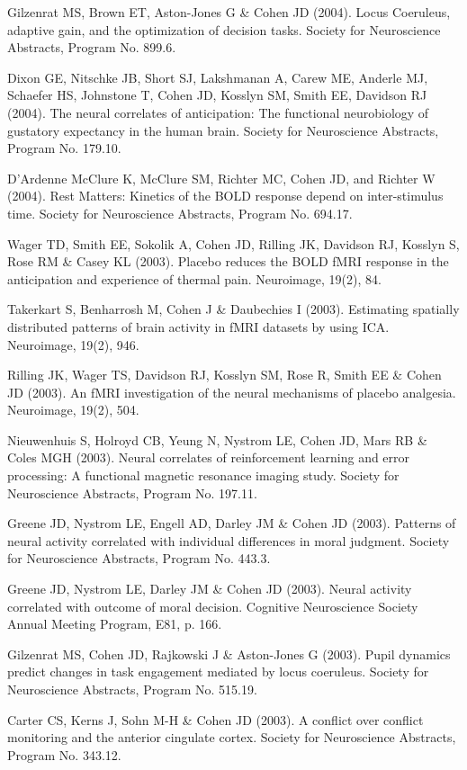 \documentclass[10 pt]{article}
\begin{document}
Gilzenrat MS, Brown ET, Aston-Jones G \& Cohen JD (2004). Locus Coeruleus, adaptive gain, and the optimization of decision tasks. Society for Neuroscience Abstracts, Program No. 899.6.

Dixon GE, Nitschke JB, Short SJ, Lakshmanan A, Carew ME, Anderle MJ, Schaefer HS, Johnstone T, Cohen JD, Kosslyn SM, Smith EE, Davidson RJ (2004). The neural correlates of anticipation: The functional neurobiology of gustatory expectancy in the human brain. Society for Neuroscience Abstracts, Program No. 179.10.

D’Ardenne McClure K, McClure SM, Richter MC, Cohen JD, and Richter W (2004). Rest Matters: Kinetics of the BOLD response depend on inter-stimulus time. Society for Neuroscience Abstracts, Program No. 694.17.

Wager TD, Smith EE, Sokolik A, Cohen JD, Rilling JK, Davidson RJ, Kosslyn S, Rose RM \& Casey KL (2003). Placebo reduces the BOLD fMRI response in the anticipation and experience of thermal pain. Neuroimage, 19(2), 84.

Takerkart S, Benharrosh M, Cohen J \& Daubechies I (2003). Estimating spatially distributed patterns of brain activity in fMRI datasets by using ICA. Neuroimage, 19(2), 946.

Rilling JK, Wager TS, Davidson RJ, Kosslyn SM, Rose R, Smith EE \& Cohen JD (2003). An fMRI investigation of the neural mechanisms of placebo analgesia. Neuroimage, 19(2), 504.

Nieuwenhuis S, Holroyd CB, Yeung N, Nystrom LE, Cohen JD, Mars RB \& Coles MGH (2003). Neural correlates of reinforcement learning and error processing: A functional magnetic resonance imaging study. Society for Neuroscience Abstracts, Program No. 197.11.

Greene JD, Nystrom LE, Engell AD, Darley JM \& Cohen JD (2003). Patterns of neural activity correlated with individual differences in moral judgment. Society for Neuroscience Abstracts, Program No. 443.3.

Greene JD, Nystrom LE, Darley JM \& Cohen JD (2003). Neural activity correlated with outcome of moral decision. Cognitive Neuroscience Society  Annual Meeting Program, E81, p. 166.

Gilzenrat MS, Cohen JD, Rajkowski J \& Aston-Jones G (2003). Pupil dynamics predict changes in task engagement mediated by locus coeruleus. Society for Neuroscience Abstracts, Program No. 515.19.

Carter CS, Kerns J, Sohn M-H \& Cohen JD (2003). A conflict over conflict monitoring and the anterior cingulate cortex. Society for Neuroscience Abstracts, Program No. 343.12.
\end{document}
